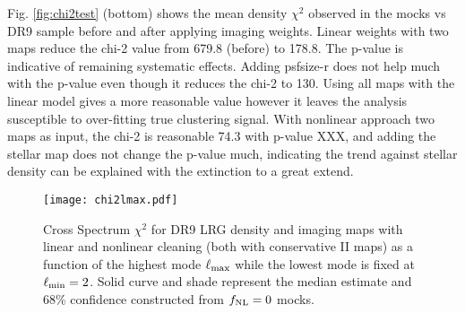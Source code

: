 Fig. \ref{fig:chi2test} (bottom) shows the mean density $\chi^{2}$ observed in the mocks vs DR9 sample before and after applying imaging weights. Linear weights with two maps reduce the chi-2 value from 679.8 (before) to 178.8. The p-value is indicative of remaining systematic effects. Adding psfsize-r does not help much with the p-value even though it reduces the chi-2 to 130. Using all maps with the linear model gives a more reasonable value however it leaves the analysis susceptible to over-fitting true clustering signal. With nonlinear approach two maps as input, the chi-2 is reasonable 74.3 with p-value XXX, and adding the stellar map does not change the p-value much, indicating the trend against stellar density can be explained with the extinction to a great extend. 

\begin{figure}
\centering
\texttt{[image: chi2lmax.pdf]}
\caption{Cross Spectrum $\chi^{2}$ for DR9 LRG density and imaging maps with linear and nonlinear cleaning (both with conservative II maps) as a function of the highest mode $\ell_{\rm max}$ while the lowest mode is fixed at $\ell_{\rm min}=2$. Solid curve and shade represent the median estimate and $68\%$ confidence constructed from $f_{\rm NL}=0$ mocks.}\label{fig:chi2cellextend}
\end{figure}